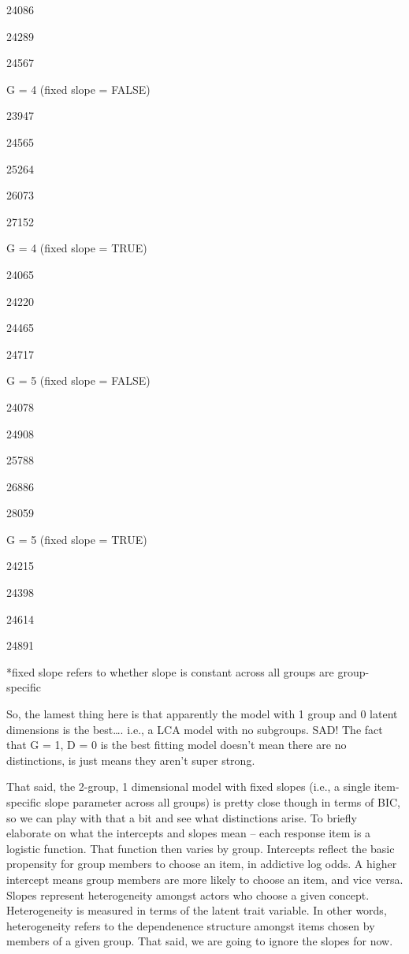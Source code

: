 \documentclass[
]{article}
\begin{document}
24086

24289

24567

G = 4 (fixed slope = FALSE)

23947

24565

25264

26073

27152

G = 4 (fixed slope = TRUE)

24065

24220

24465

24717

G = 5 (fixed slope = FALSE)

24078

24908

25788

26886

28059

G = 5 (fixed slope = TRUE)

24215

24398

24614

24891

*fixed slope refers to whether slope is constant across all groups are
group-specific

So, the lamest thing here is that apparently the model with 1 group and
0 latent dimensions is the best\ldots. i.e., a LCA model with no
subgroups. SAD! The fact that G = 1, D = 0 is the best fitting model
doesn't mean there are no distinctions, is just means they aren't super
strong.

That said, the 2-group, 1 dimensional model with fixed slopes (i.e., a
single item-specific slope parameter across all groups) is pretty close
though in terms of BIC, so we can play with that a bit and see what
distinctions arise. To briefly elaborate on what the intercepts and
slopes mean -- each response item is a logistic function. That function
then varies by group. Intercepts reflect the basic propensity for group
members to choose an item, in addictive log odds. A higher intercept
means group members are more likely to choose an item, and vice versa.
Slopes represent heterogeneity amongst actors who choose a given
concept. Heterogeneity is measured in terms of the latent trait
variable. In other words, heterogeneity refers to the dependenence
structure amongst items chosen by members of a given group. That said,
we are going to ignore the slopes for now.
\end{document}
